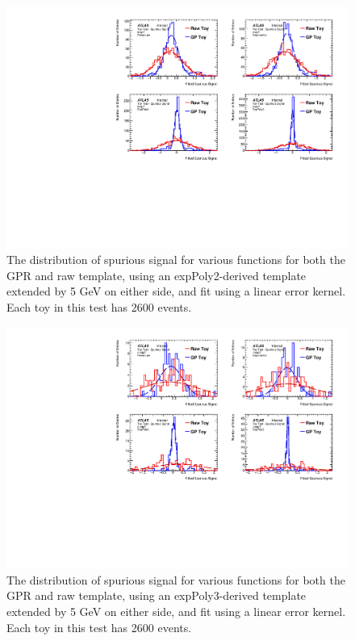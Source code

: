 \begin{figure} 
\begin{center}
  \includegraphics[width=\textwidth]{figures/background/gpr/validation/linear/ToyTest_FitSigVals_lowpT_2600_noSig}   
\caption{The distribution of spurious signal for various functions for both the GPR and raw template, using an expPoly2-derived template extended by 5 GeV on either side, and fit using a linear error kernel. Each toy in this test has 2600 events.}
\label{fig:linearkernel_lowpt_2600_noSig}
\end{center}
\end{figure}

\begin{figure} 
\begin{center}
  \includegraphics[width=\textwidth]{figures/background/gpr/validation/linear/ToyTest_FitSigVals_medpT_2600_noSig}   
\caption{The distribution of spurious signal for various functions for both the GPR and raw template, using an expPoly3-derived template extended by 5 GeV on either side, and fit using a linear error kernel. Each toy in this test has 2600 events.}
\label{fig:linearkernel_medpt_2600_noSig}
\end{center}
\end{figure}

